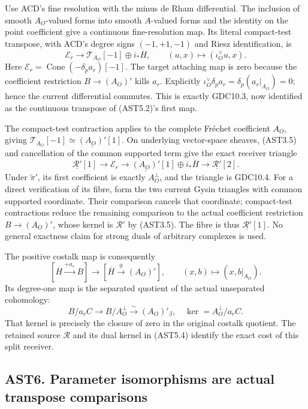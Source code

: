 Use ACD's fine resolution with the minus de Rham differential. The
inclusion of smooth \(A_O\)-valued forms into smooth \(A\)-valued forms
and the identity on the point coefficient give a continuous
fine-resolution map. Its literal compact-test transpose, with ACD's
degree signs \((-1,+1,-1)\) and Riesz identification, is \[
\mathscr E_r\longrightarrow
\mathscr T_{A_O}[-1]\oplus i_*\overline H,
\qquad (u,x)\longmapsto(\iota_O^\vee u,x).
\tag{AST5.3}
\] Here \(\mathscr E_r=\operatorname{Cone}(-\delta_pa_r)[-1]\). The
target attaching map is zero because the coefficient restriction
\(B\to(A_O)'\) kills \(a_r\). Explicitly
\(\iota_O^\vee\delta_pa_r=\delta_p(a_r|_{A_O})=0\); hence the current
differential commutes. This is exactly GDC10.3, now identified as the
continuous transpose of (AST5.2)'s first map.

The compact-test contraction applies to the complete Fréchet coefficient
\(A_O\), giving \(\mathscr T_{A_O}[-1]\simeq\underline{(A_O)'}[1]\). On
underlying vector-space sheaves, (AST3.5) and cancellation of the common
supported term give the exact receiver triangle \[
\boxed{\underline{\mathcal R'}[1]\longrightarrow\mathscr E_r
\longrightarrow\underline{(A_O)'}[1]\oplus i_*\overline H
\longrightarrow\underline{\mathcal R'}[2].}
\tag{AST5.4}
\] Under \(\widetilde\pi'\), its first coefficient is exactly
\(A_O^\perp\), and the triangle is GDC10.4. For a direct verification of
its fibre, form the two current Gysin triangles with common supported
coordinate. Their comparison cancels that coordinate; compact-test
contractions reduce the remaining comparison to the actual coefficient
restriction \(B\to(A_O)'\), whose kernel is \(\mathcal R'\) by (AST3.5).
The fibre is thus \(\underline{\mathcal R'}[1]\). No general exactness
claim for strong duals of arbitrary complexes is used.

The positive costalk map is consequently \[
[\overline H\xrightarrow{+a_r}B]
\longrightarrow[\overline H\xrightarrow{0}(A_O)'],
\qquad(x,b)\longmapsto(x,b|_{A_O}).
\tag{AST5.5}
\] Its degree-one map is the separated quotient of the actual
unseparated cohomology: \[
B/a_rC\longrightarrow B/A_O^\perp\xrightarrow{\sim}(A_O)'_\beta,
\quad
\ker= A_O^\perp/a_rC.
\tag{AST5.6}
\] That kernel is precisely the closure of zero in the original costalk
quotient. The retained source \(\mathcal R\) and its dual kernel in
(AST5.4) identify the exact cost of this split receiver.

\subsection{AST6. Parameter isomorphisms are actual transpose
comparisons}\label{ast6.-parameter-isomorphisms-are-actual-transpose-comparisons}

